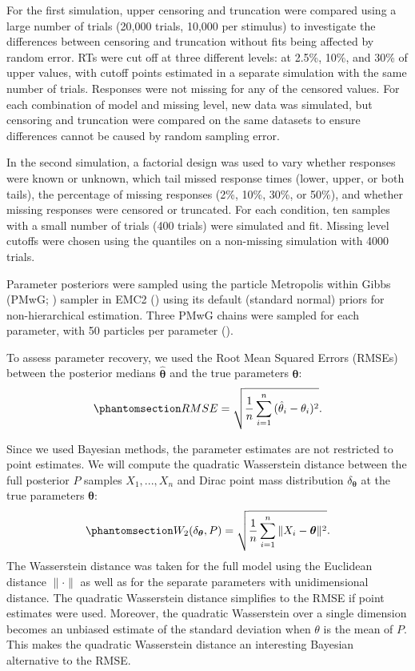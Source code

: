 \documentclass[
  stu,
  floatsintext,
  longtable,
  nolmodern,
  notxfonts,
  notimes,
  draftfirst,
  colorlinks=true,linkcolor=blue,citecolor=blue,urlcolor=blue]{apa7}
\begin{document}
For the first simulation, upper censoring and truncation were compared
using a large number of trials (20,000 trials, 10,000 per stimulus) to
investigate the differences between censoring and truncation without
fits being affected by random error. RTs were cut off at three different
levels: at 2.5\%, 10\%, and 30\% of upper values, with cutoff points
estimated in a separate simulation with the same number of trials.
Responses were not missing for any of the censored values. For each
combination of model and missing level, new data was simulated, but
censoring and truncation were compared on the same datasets to ensure
differences cannot be caused by random sampling error.

In the second simulation, a factorial design was used to vary whether
responses were known or unknown, which tail missed response times
(lower, upper, or both tails), the percentage of missing responses (2\%,
10\%, 30\%, or 50\%), and whether missing responses were censored or
truncated. For each condition, ten samples with a small number of trials
(400 trials) were simulated and fit. Missing level cutoffs were chosen
using the quantiles on a non-missing simulation with 4000 trials.

Parameter posteriors were sampled using the particle Metropolis within
Gibbs (PMwG; ) sampler in EMC2
() using its default
(standard normal) priors for non-hierarchical estimation. Three PMwG
chains were sampled for each parameter, with 50 particles per parameter
().

To assess parameter recovery, we used the Root Mean Squared Errors
(RMSEs) between the posterior medians \(\boldsymbol{\hat{\theta}}\) and
the true parameters \(\boldsymbol{\theta}\):
\begin{equation}\phantomsection\label{eq-RMSE}{
RMSE = \sqrt{\frac{1}{n}\sum_{i=1}^{n}{(\hat{\theta}_i - \theta_i)^2}}.
}\end{equation}

Since we used Bayesian methods, the parameter estimates are not
restricted to point estimates. We will compute the quadratic Wasserstein
distance between the full posterior \(P\) samples \(X_1,...,X_n\) and
Dirac point mass distribution \(\delta_{\boldsymbol{\theta}}\) at the
true parameters \(\boldsymbol{\theta}\):
\begin{equation}\phantomsection\label{eq-Wasserstein}{
W_2(\delta_{\boldsymbol{\theta}}, P) = \sqrt{\frac{1}{n} \sum_{i=1}^{n}{\|X_i - \boldsymbol{\theta}\|^2}}.
}\end{equation} The Wasserstein distance was taken for the full model
using the Euclidean distance \(\|\cdot\|\) as well as for the separate
parameters with unidimensional distance. The quadratic Wasserstein
distance simplifies to the RMSE if point estimates were used. Moreover,
the quadratic Wasserstein over a single dimension becomes an unbiased
estimate of the standard deviation when \(\theta\) is the mean of \(P\).
This makes the quadratic Wasserstein distance an interesting Bayesian
alternative to the RMSE.
\end{document}
